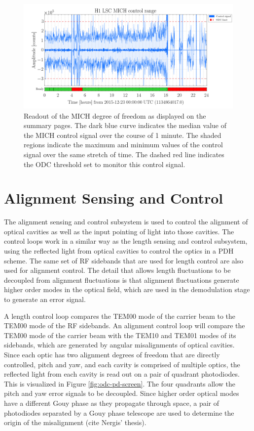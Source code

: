 \begin{figure}[ht!]
\includegraphics[width=\textwidth]{figures/ODC/H1-MICH-SUMMARY-PAGES}
\caption[MICH control signal on summary pages]{Readout of the MICH degree of freedom as %
         displayed on the summary pages. The dark blue curve indicates the median value of %
         the MICH control signal over the course of 1 minute. The shaded regions indicate %
         the maximum and minimum values of the control signal over the same stretch of time. %
         The dashed red line indicates the ODC threshold set to monitor this control signal.}
\label{fig:mich-summary-pages}
\end{figure}

\section{Alignment Sensing and Control}

The alignment sensing and control subsystem is used to control the alignment of 
optical cavities as well as the input pointing of light into those cavities. 
The control loops work in a similar way as the length sensing and control subsystem, 
using the reflected light from optical cavities to control the optics in a PDH 
scheme. The same set of RF sidebands that are used for length control are also used 
for alignment control. The detail that allows length fluctuations to be decoupled from 
alignment fluctuations is that alignment fluctuations generate higher order 
modes in the optical field, which are used in the demodulation stage to 
generate an error signal.

A length control loop compares the TEM00 mode of the carrier beam to the TEM00 
mode of the RF sidebands. 
An alignment control loop will compare the TEM00 mode of the carrier 
beam with the TEM10 and TEM01 modes of its sidebands, which are generated by 
angular misalignments of optical cavities. 
Since each optic has two alignment degrees of freedom that are directly 
controlled, pitch and yaw, and each cavity is comprised of multiple optics, 
the reflected light from each cavity is read out on a 
pair of quadrant photodiodes. This is visualized in Figure \ref{fig:odc-pd-screen}. 
The four quadrants allow the pitch and yaw error 
signals to be decoupled. Since higher order optical modes have a different Gouy 
phase as they propagate through space, a pair of photodiodes separated by a Gouy 
phase telescope are used to determine the origin of the misalignment 
(cite Nergis' thesis).

